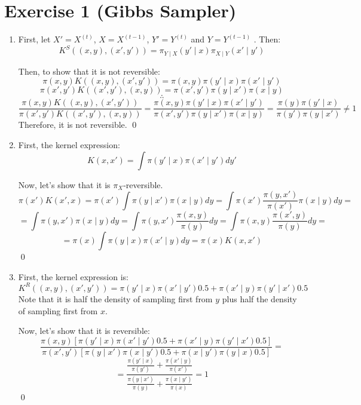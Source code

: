 \documentclass[12pt,letterpaper]{article}
\begin{document}

\section*{Exercise 1 (Gibbs Sampler)}
\begin{enumerate}[leftmargin=!,labelindent=5pt]
\item First, let $X' = X^{(t)}$, $X = X^{(t-1)}$, $Y' = Y^{(t)}$ and
$Y = Y^{(t-1)}$
. Then:
$$
K^S((x,y),(x',y')) = \pi_{Y\mid X}(y' \mid x) \pi_{X \mid Y}(x' \mid y')
$$

Then, to show that it is not reversible:
$$
\pi(x,y)K((x,y),(x',y')) = \pi(x,y) \pi(y' \mid x) \pi(x' \mid y')
$$
$$ 
\pi(x',y')K((x',y'),(x,y)) = \pi(x',y') \pi(y \mid x') \pi(x \mid y)
$$
$$
\therefore
$$
$$
\frac{\pi(x,y)K((x,y),(x',y'))}
{\pi(x',y')K((x',y'),(x,y))} =
\frac{\pi(x,y) \pi(y' \mid x) \pi(x' \mid y')}
{\pi(x',y') \pi(y \mid x') \pi(x \mid y)} = 
\frac{\pi(y)\pi(y' \mid x)}
{\pi(y')\pi(y \mid x')} \neq 1
$$
Therefore, it is not reversible.
\qed

\item First, the kernel expression:
$$
K(x, x') = \int \pi(y' \mid x) \pi(x' \mid y') dy'
$$

Now, let's show that it is $\pi_X$-reversible.
$$
\pi(x')K(x', x) = \pi(x') \int \pi(y \mid x') \pi(x \mid y) dy
=
\int \pi(x') \frac{\pi(y,x')}{\pi(x')}\pi(x\mid y) dy =
$$
$$
=
\int \pi(y,x') \pi(x \mid y) dy = 
\int \pi(y,x') \frac{\pi(x,y)}{\pi(y)}dy =
\int \pi(x,y) \frac{\pi(x',y)}{\pi(y)}dy =
$$
$$
= \pi(x)\int \pi(y \mid x) \pi(x' \mid y)  dy = \pi(x)K(x,x')
$$
\qed

\item First, the kernel expression is:
$$
K^R((x,y),(x',y')) = 
\pi(y' \mid x)\pi(x' \mid y')0.5 + \pi(x' \mid y)\pi(y' \mid x')0.5
$$
Note that it is half the density of sampling first from $y$ plus 
half the density of sampling first from $x$.

Now, let's show that it is reversible:
$$
\frac{\pi(x,y)[\pi(y' \mid x)\pi(x' \mid y')0.5 +
\pi(x' \mid y)\pi(y' \mid x')0.5]}
{
\pi(x',y')[\pi(y \mid x')\pi(x \mid y')0.5 +
\pi(x \mid y')\pi(y \mid x)0.5 ]
} = 
$$
$$ =
\frac{
	\frac{\pi(y' \mid x)}
	{\pi(y')}
	+
	\frac{\pi(x' \mid y)}
	{\pi(x')}
}
{
	\frac{\pi(y \mid x')}
	{\pi(y)}
	+
	\frac{\pi(x \mid y')}
	{\pi(x)}
} = 
1
$$
\qed
\end{enumerate}

\newpage
\end{document}
